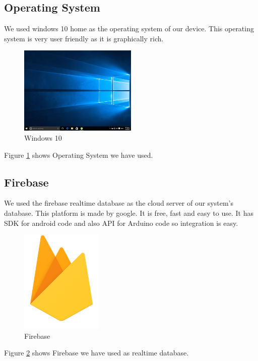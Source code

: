 \subsection{Operating System}
We used windows 10 home as the operating system of our device. This operating system is very user friendly as it is graphically rich.
\begin{figure}[h]
\centering
\includegraphics[width=0.5\textwidth]{figures/windows_10.jpg}
\caption{Windows 10}
\label{OS1}
\end{figure}
Figure \ref{OS1} shows Operating System  we have used.

\pagebreak
\subsection{Firebase}
We used the firebase realtime database as the cloud server of our system's database. This platform is made by google. It is free, fast and easy to use. It has SDK for android code and also API for Arduino code so integration is easy.
\begin{figure}[h]
\centering
\includegraphics[width=0.35\textwidth]{figures/firebase.png}
\caption{Firebase}
\label{Firebase1}
\end{figure}
Figure \ref{Firebase1} shows Firebase  we have used as realtime database.



